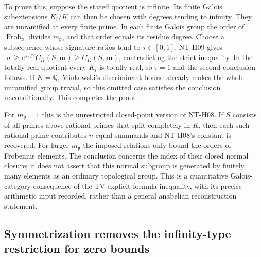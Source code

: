 To prove this, suppose the stated quotient is infinite.  Its finite
Galois subextensions $K_i/K$ can then be chosen with degrees tending
to infinity.  They are unramified at every finite prime.  In each
finite Galois group the order of
$\operatorname{Frob}_{\mathfrak p}$ divides
$m_{\mathfrak p}$, and that order equals its residue degree.
Choose a subsequence whose signature ratios tend to
$\tau\in[0,1]$.  NT-H09 gives
$\varrho\ge e^{\pi\tau/2}C_K(S,\boldsymbol m)
\ge C_K(S,\boldsymbol m)$, contradicting the strict inequality.
In the totally real quotient every $K_i$ is totally real, so
$\tau=1$ and the second conclusion follows.  If $K=\mathbb Q$,
Minkowski's discriminant bound already makes the whole unramified
group trivial, so this omitted case satisfies the conclusion
unconditionally.  This completes the proof.

For $m_{\mathfrak p}=1$ this is the unrestricted closed-point
version of NT-H08.  If $S$ consists of all primes above rational
primes that split completely in $K$, then each such rational prime
contributes $n$ equal summands and NT-H08's constant is recovered.
For larger $m_{\mathfrak p}$ the imposed relations only bound the
orders of Frobenius elements.  The conclusion concerns the index
of their closed normal closure; it does not assert that this normal
subgroup is generated by finitely many elements as an ordinary
topological group.  This is a quantitative Galois-category
consequence of the TV explicit-formula inequality, with its precise
arithmetic input recorded, rather than a general anabelian
reconstruction statement.

\subsection{Symmetrization removes the infinity-type restriction for zero bounds}

